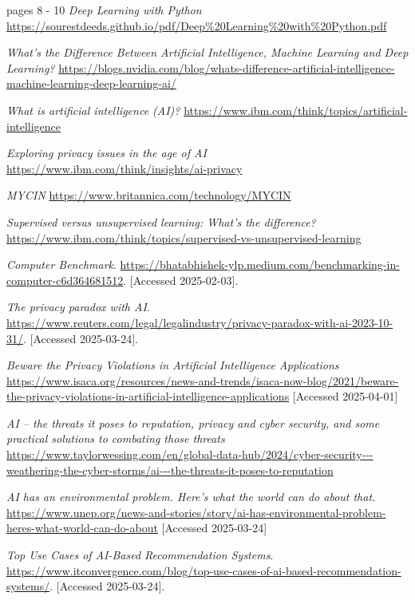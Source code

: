 \documentclass[licencjacka,en]{pracamgr}
\begin{document}
\begin{thebibliography}{199}
pages 8 - 10
\textit{Deep Learning with Python}
\url{https://sourestdeeds.github.io/pdf/Deep%20Learning%20with%20Python.pdf}

\textit{What’s the Difference Between Artificial Intelligence, Machine Learning and Deep Learning?}
\url{https://blogs.nvidia.com/blog/whats-difference-artificial-intelligence-machine-learning-deep-learning-ai/}

\textit{What is artificial intelligence (AI)?}
\url{https://www.ibm.com/think/topics/artificial-intelligence}

\textit{Exploring privacy issues in the age of AI}
\url{https://www.ibm.com/think/insights/ai-privacy}

\textit{MYCIN}
\url{https://www.britannica.com/technology/MYCIN}

\textit{Supervised versus unsupervised learning: What's the difference?}
\url{https://www.ibm.com/think/topics/supervised-vs-unsupervised-learning}

\textit{Computer Benchmark}.
\url{https://bhatabhishek-ylp.medium.com/benchmarking-in-computer-c6d364681512}.
[Accessed 2025-02-03].

\textit{The privacy paradox with AI}.
\url{https://www.reuters.com/legal/legalindustry/privacy-paradox-with-ai-2023-10-31/}.
[Accessed 2025-03-24].

\textit{Beware the Privacy Violations in Artificial Intelligence Applications}
\url{https://www.isaca.org/resources/news-and-trends/isaca-now-blog/2021/beware-the-privacy-violations-in-artificial-intelligence-applications}
[Accessed 2025-04-01]

\textit{AI – the threats it poses to reputation, privacy and cyber security, and some practical solutions to combating those threats}
\url{https://www.taylorwessing.com/en/global-data-hub/2024/cyber-security---weathering-the-cyber-storms/ai---the-threats-it-poses-to-reputation}

\textit{AI has an environmental problem. Here’s what the world can do about that.}
\url{https://www.unep.org/news-and-stories/story/ai-has-environmental-problem-heres-what-world-can-do-about}
[Accessed 2025-03-24]

\textit{Top Use Cases of AI-Based Recommendation Systems}.
\url{https://www.itconvergence.com/blog/top-use-cases-of-ai-based-recommendation-systems/}.
[Accessed 2025-03-24].


\end{thebibliography}
\end{document}
